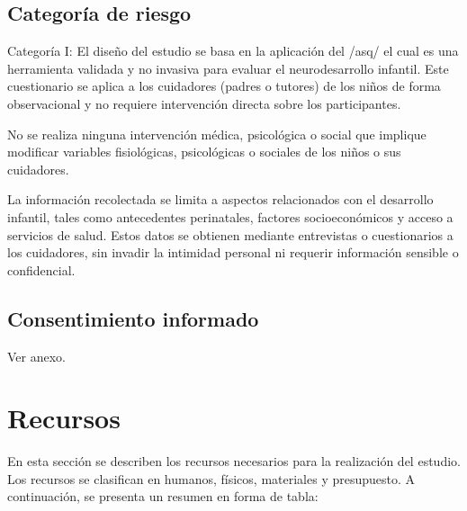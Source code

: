 \documentclass[11pt,letterpaper]{report}
\begin{document}
\subsection{Categoría de riesgo}
Categoría I: El diseño del estudio se basa en la aplicación del /asq/ el cual
es una herramienta validada y no invasiva para evaluar el neurodesarrollo
infantil. Este cuestionario se aplica a los cuidadores (padres o tutores) de
los niños de forma observacional y no requiere intervención directa sobre los
participantes.

No se realiza ninguna intervención médica, psicológica o social que implique
modificar variables fisiológicas, psicológicas o sociales de los niños o sus
cuidadores.

La información recolectada se limita a aspectos relacionados con el desarrollo
infantil, tales como antecedentes perinatales, factores socioeconómicos y
acceso a servicios de salud. Estos datos se obtienen mediante entrevistas o
cuestionarios a los cuidadores, sin invadir la intimidad personal ni requerir
información sensible o confidencial.

\subsection{Consentimiento informado}
Ver anexo.

\section{Recursos}

En esta sección se describen los recursos necesarios para la realización del estudio. Los recursos se clasifican en humanos, físicos, materiales y presupuesto. A continuación, se presenta un resumen en forma de tabla:
\end{document}
